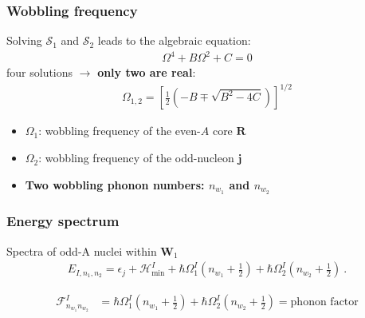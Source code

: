 \documentclass{beamer}
\begin{document}
\begin{frame}
	\frametitle{Wobbling frequency}
	Solving {\color{red}$\mathcal{S}_1$} and {\color{blue}$\mathcal{S}_2$} leads to the algebraic equation:
	\begin{align}
		\Omega^4+B\Omega^2+C=0\nonumber
	\end{align}
	four solutions $\longrightarrow$ \textbf{only two are real}:
	\begin{align}
		\Omega_{1,2}=\left[\frac{1}{2}\left(-B\mp\sqrt{B^2-4C}\right)\right]^{1/2}\nonumber
	\end{align}
	\begin{itemize}
		\item {\color{red}$\Omega_1$}: wobbling frequency of the {\color{red}even-$A$ core $\mathbf{R}$}
		\item {\color{blue}$\Omega_2$}: wobbling frequency of the {\color{blue}odd-nucleon $\mathbf{j}$}
		\item \textbf{Two wobbling phonon numbers: {\color{red}$n_{w_1}$} and {\color{blue}$n_{w_2}$}}
	\end{itemize}
\end{frame}

\begin{frame}
	\frametitle{Energy spectrum}
	\begin{exampleblock}{Spectra of odd-A nuclei within $\mathbf{W}_1$}
		\begin{align}
			E_{I,n_1,n_2}=\epsilon_j+\mathcal{H}_\text{min}^I+\hbar\Omega_1^I\left(n_{w_1}+\frac{1}{2}\right)+\hbar\Omega_2^I\left(n_{w_2}+\frac{1}{2}\right)\nonumber\ .
			\label{tsd-bands-general-spectrum}
		\end{align}
	\end{exampleblock}
	\begin{align}
		\mathcal{F}_{n_{w_1}n_{w_2}}^I&=\hbar\Omega_1^I\left(n_{w_1}+\frac{1}{2}\right)+\hbar\Omega_2^I\left(n_{w_2}+\frac{1}{2}\right)=\text{phonon factor}\nonumber
	\end{align}
\end{frame}
\end{document}
